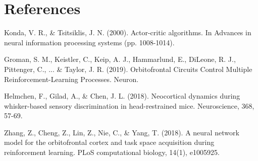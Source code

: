 \documentclass[11pt]{article}
\begin{document}
\section{References}

Konda, V. R., \& Tsitsiklis, J. N. (2000). Actor-critic algorithms. In Advances in neural information processing systems (pp. 1008-1014).

Groman, S. M., Keistler, C., Keip, A. J., Hammarlund, E., DiLeone, R. J., Pittenger, C., ... \& Taylor, J. R. (2019). Orbitofrontal Circuits Control Multiple Reinforcement-Learning Processes. Neuron.

Helmchen, F., Gilad, A., \& Chen, J. L. (2018). Neocortical dynamics during whisker-based sensory discrimination in head-restrained mice. Neuroscience, 368, 57-69.

Zhang, Z., Cheng, Z., Lin, Z., Nie, C., \& Yang, T. (2018). A neural network model for the orbitofrontal cortex and task space acquisition during reinforcement learning. PLoS computational biology, 14(1), e1005925.
\end{document}
